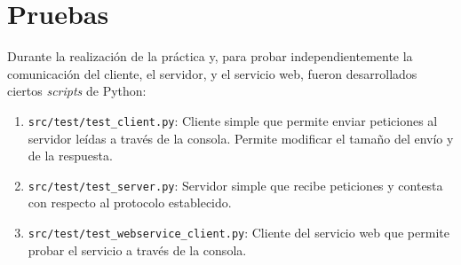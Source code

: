 \section{Pruebas}

Durante la realización de la práctica y, para probar independientemente la comunicación del cliente, el servidor, y el servicio web, fueron desarrollados ciertos \textit{scripts} de Python:
\begin{enumerate}
    \item \texttt{src/test/test\_client.py}: Cliente simple que permite enviar peticiones al servidor leídas a través de la consola. Permite modificar el tamaño del envío y de la respuesta.
    \item \texttt{src/test/test\_server.py}: Servidor simple que recibe peticiones y contesta con respecto al protocolo establecido.
    \item \texttt{src/test/test\_webservice\_client.py}: Cliente del servicio web que permite probar el servicio a través de la consola.
\end{enumerate}

